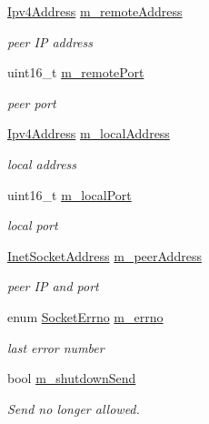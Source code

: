 \begin{DoxyCompactItemize}
\hyperlink{classns3_1_1Ipv4Address}{Ipv4\+Address} \hyperlink{classns3_1_1NscTcpSocketImpl_aa61f63cf0fa0e3fe3e02a5a90224caf9}{m\+\_\+remote\+Address}
\begin{DoxyCompactList}\small\item\em peer IP address \end{DoxyCompactList}\item 
uint16\+\_\+t \hyperlink{classns3_1_1NscTcpSocketImpl_ad0094ba92f10c47bc783acf5c15026b7}{m\+\_\+remote\+Port}
\begin{DoxyCompactList}\small\item\em peer port \end{DoxyCompactList}\item 
\hyperlink{classns3_1_1Ipv4Address}{Ipv4\+Address} \hyperlink{classns3_1_1NscTcpSocketImpl_ad7a63092b598e001f4e8825e3ee30cc3}{m\+\_\+local\+Address}
\begin{DoxyCompactList}\small\item\em local address \end{DoxyCompactList}\item 
uint16\+\_\+t \hyperlink{classns3_1_1NscTcpSocketImpl_aa591275dc269c0d7b803d83ccd3279aa}{m\+\_\+local\+Port}
\begin{DoxyCompactList}\small\item\em local port \end{DoxyCompactList}\item 
\hyperlink{classns3_1_1InetSocketAddress}{Inet\+Socket\+Address} \hyperlink{classns3_1_1NscTcpSocketImpl_aa40744cb48bdd7d29b375ede7b736978}{m\+\_\+peer\+Address}
\begin{DoxyCompactList}\small\item\em peer IP and port \end{DoxyCompactList}\item 
enum \hyperlink{classns3_1_1Socket_ada1328c5ae0c28cb2a982caf8f6d6cca}{Socket\+Errno} \hyperlink{classns3_1_1NscTcpSocketImpl_a0b99e66d2b5eb67310a29b3ab39f53a7}{m\+\_\+errno}
\begin{DoxyCompactList}\small\item\em last error number \end{DoxyCompactList}\item 
bool \hyperlink{classns3_1_1NscTcpSocketImpl_a1de235841a1bb10b91b7238bb77ce45f}{m\+\_\+shutdown\+Send}
\begin{DoxyCompactList}\small\item\em Send no longer allowed. \end{DoxyCompactList}\item 

\end{DoxyCompactItemize}
